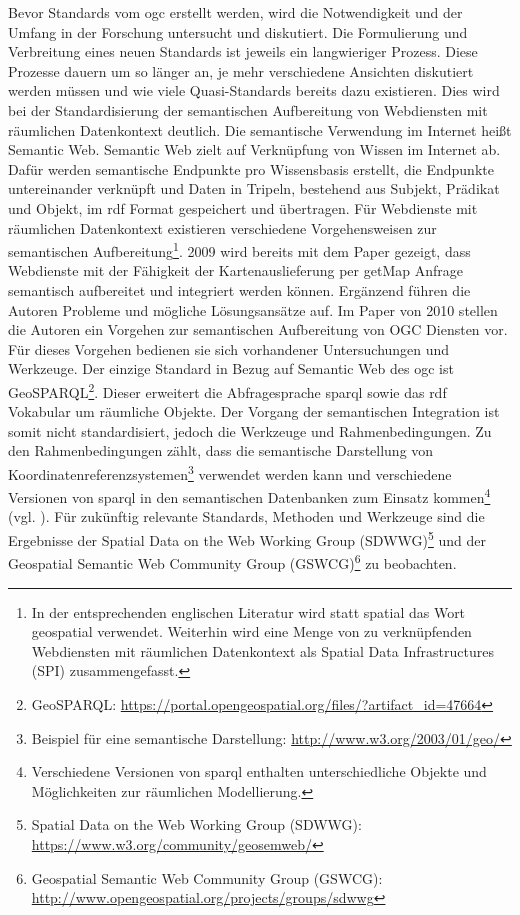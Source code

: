 Bevor Standards vom \Gls{ogc} erstellt werden, wird die Notwendigkeit und der Umfang in der Forschung untersucht und diskutiert.
Die Formulierung und Verbreitung eines neuen Standards ist jeweils ein langwieriger Prozess.
Diese Prozesse dauern um so länger an, je mehr verschiedene Ansichten diskutiert werden müssen und wie viele Quasi-Standards bereits dazu existieren.
Dies wird bei der Standardisierung der semantischen Aufbereitung von Webdiensten mit räumlichen Datenkontext deutlich.
Die semantische Verwendung im Internet heißt Semantic Web.
Semantic Web zielt auf Verknüpfung von Wissen im Internet ab.
Dafür werden semantische Endpunkte pro Wissensbasis erstellt, die Endpunkte untereinander verknüpft und Daten in Tripeln, bestehend aus Subjekt, Prädikat und Objekt, im \Gls{rdf} Format gespeichert und übertragen.
Für Webdienste mit räumlichen Datenkontext existieren verschiedene Vorgehensweisen zur semantischen Aufbereitung\footnote{In der entsprechenden englischen Literatur wird statt spatial das Wort geospatial verwendet. Weiterhin wird eine Menge von zu verknüpfenden Webdiensten mit räumlichen Datenkontext als Spatial Data Infrastructures (SPI) zusammengefasst.}.
2009 wird bereits mit dem Paper \cite{report:semgeospatinte} gezeigt, dass Webdienste mit der Fähigkeit der Kartenauslieferung per \glqq{}getMap\grqq{} Anfrage semantisch aufbereitet und integriert werden können.
Ergänzend führen die Autoren Probleme und mögliche Lösungsansätze auf.
Im Paper \cite{report:semenspa} von 2010 stellen die Autoren ein Vorgehen zur semantischen Aufbereitung von OGC Diensten vor.
Für dieses Vorgehen bedienen sie sich vorhandener Untersuchungen und Werkzeuge.
Der einzige Standard in Bezug auf Semantic Web des \Gls{ogc} ist GeoSPARQL\footnote{GeoSPARQL: \url{https://portal.opengeospatial.org/files/?artifact_id=47664}}.
Dieser erweitert die Abfragesprache \Gls{sparql} sowie das \Gls{rdf} Vokabular um räumliche Objekte.
Der Vorgang der semantischen Integration ist somit nicht standardisiert, jedoch die Werkzeuge und Rahmenbedingungen.
Zu den Rahmenbedingungen zählt, dass die semantische Darstellung von Koordinatenreferenzsystemen\footnote{Beispiel für eine semantische Darstellung: \url{http://www.w3.org/2003/01/geo/}} verwendet werden kann und verschiedene Versionen von \Gls{sparql} in den semantischen Datenbanken zum Einsatz kommen\footnote{Verschiedene Versionen von \Gls{sparql} enthalten unterschiedliche Objekte und Möglichkeiten zur räumlichen Modellierung.} (vgl. \cite[S.5]{book:semgeosparql}).
Für zukünftig relevante Standards, Methoden und Werkzeuge sind die Ergebnisse der Spatial Data on the Web Working Group (SDWWG)\footnote{Spatial Data on the Web Working Group (SDWWG): \url{https://www.w3.org/community/geosemweb/}} und der Geospatial Semantic Web Community Group (GSWCG)\footnote{Geospatial Semantic Web Community Group (GSWCG): \url{http://www.opengeospatial.org/projects/groups/sdwwg}} zu beobachten. 

